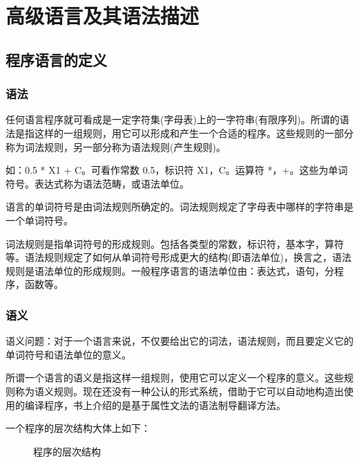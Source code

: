 \newpage
\section{高级语言及其语法描述}
\subsection{程序语言的定义}
\subsubsection{语法}

任何语言程序就可看成是一定字符集(字母表)上的一字符串(有限序列)。所谓的语法是指这样的一组规则，用它可以形成和产生一个合适的程序。这些规则的一部分称为词法规则，另一部分称为语法规则(产生规则)。

如：0.5 * X1 + C。可看作常数 0.5，标识符 X1，C。运算符 *，+。这些为单词符号。表达式称为语法范畴，或语法单位。

语言的单词符号是由词法规则所确定的。词法规则规定了字母表中哪样的字符串是一个单词符号。

词法规则是指单词符号的形成规则。包括各类型的常数，标识符，基本字，算符等。语法规则规定了如何从单词符号形成更大的结构(即语法单位)，换言之，语法规则是语法单位的形成规则。一般程序语言的语法单位由：表达式，语句，分程序，函数等。

\subsubsection{语义}

语义问题：对于一个语言来说，不仅要给出它的词法，语法规则，而且要定义它的单词符号和语法单位的意义。

所谓一个语言的语义是指这样一组规则，使用它可以定义一个程序的意义。这些规则称为语义规则。现在还没有一种公认的形式系统，借助于它可以自动地构造出使用的编译程序，书上介绍的是基于属性文法的语法制导翻译方法。

一个程序的层次结构大体上如下：

\begin{figure}[H]
    \centering
    \caption{程序的层次结构}
    \label{程序的层次结构}
\end{figure}

